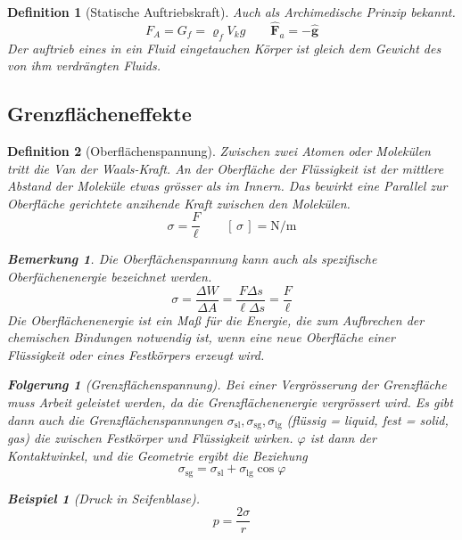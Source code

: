 \documentclass[a4paper, twocolumn]{article}
\numberwithin{equation}{section}
\theoremstyle{hsr-def}
\newtheorem{definition}{Definition}[section]
\theoremstyle{hsr-sub}
\newtheorem{result}{Folgerung}[definition]
\newtheorem{example}{Beispiel}[definition]
\newtheorem{remark}{Bemerkung}[definition]
\renewcommand{\vec}[1]{\ensuremath{\mathbf{#1}}}
\newcommand{\uvec}[1]{\ensuremath{\vec{\hat{#1}}}}
\newcommand{\unitof}[1]{\ensuremath{\left[\,#1\,\right]}}
\begin{document}
\begin{definition}[Statische Auftriebskraft] Auch als Archimedische Prinzip bekannt.
\[
    F_A = G_f = \varrho_f  V_k g
    \qquad
    \uvec{F}_a = - \uvec{g}
\]
Der auftrieb eines in ein Fluid eingetauchen K\"orper ist gleich dem Gewicht des von ihm verdr\"angten Fluids.
\end{definition}

\subsection{Grenzfl\"acheneffekte}

\begin{definition}[Oberfl\"achenspannung]
Zwischen zwei Atomen oder Molek\"ulen tritt die \emph{Van der Waals}-Kraft.
An der Oberfl\"ache der Fl\"ussigkeit ist der mittlere Abstand der Molek\"ule etwas gr\"osser als im Innern. Das bewirkt eine Parallel zur Oberfl\"ache gerichtete anzihende Kraft zwischen den Molek\"ulen.
\[
    \sigma = \frac{F}{\ell}
    \qquad
    \unitof{\sigma} = \si{\newton\per\metre}
\]
\begin{remark}
Die Oberfl\"achenspannung kann auch als \emph{spezifische Oberf\"achenenergie} bezeichnet werden.
\[
    \sigma
    = \frac{\Delta W}{\Delta A} 
    = \frac{F\Delta s}{\ell \Delta s}
    = \frac{F}{\ell}
\]
Die \emph{Oberfl\"achenenergie} ist ein Ma{\ss} f\"ur die Energie, die zum Aufbrechen der chemischen Bindungen notwendig ist, wenn eine neue Oberfl\"ache einer Fl\"ussigkeit oder eines Festkörpers erzeugt wird.
\end{remark}

\begin{result}[Grenzfl\"achenspannung]
Bei einer Vergr\"osserung der Grenzfl\"ache muss Arbeit geleistet werden, da die Grenzfl\"achenenergie vergr\"ossert wird.
Es gibt dann auch die Grenzfl\"achenspannungen 
\(
    \sigma_\text{sl},
    \sigma_\text{sg},
    \sigma_\text{lg}
\) (fl\"ussig = liquid, fest = solid, gas) die zwischen Festk\"orper und Fl\"ussigkeit wirken. \(\varphi\) ist dann der \emph{Kontaktwinkel}, und die Geometrie ergibt die Beziehung
\[
    \sigma_\text{sg} = \sigma_\text{sl} + \sigma_\text{lg} \cos \varphi
\]
\end{result}

\begin{example}[Druck in Seifenblase]
\[
    p = \frac{2\sigma}{r}
\]
\end{example}
\end{definition}
\end{document}
